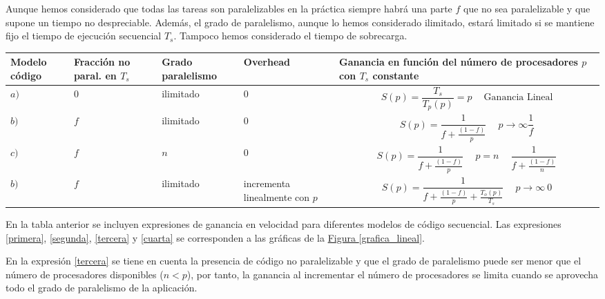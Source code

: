 \documentclass[10pt,a4paper,spanish]{report}
\begin{document}
Aunque hemos considerado que todas las tareas son paralelizables en la práctica siempre habrá una parte $f$ que no sea paralelizable y que supone un tiempo no despreciable.  Además, el grado de paralelismo, aunque lo hemos considerado ilimitado, estará limitado si se mantiene fijo el tiempo de ejecución secuencial $T_s$. Tampoco hemos considerado el tiempo de sobrecarga. 

\begin{tabular}{|p{2cm}|p{2cm}|p{2cm}|p{2cm}|p{7cm}|}
\hline
\rowcolor[rgb]{0.2,0.7,0.6} \textcolor[rgb]{1,1,1}{\textbf{Modelo código}} & \textcolor[rgb]{1,1,1}{\textbf{Fracción no paral. en $T_s$}} & \textcolor[rgb]{1,1,1}{\textbf{Grado paralelismo}} & \textcolor[rgb]{1,1,1}{\textbf{Overhead}} & \textcolor[rgb]{1,1,1}{\textbf{Ganancia en función del número de procesadores $p$ con $T_s$ constante}} \\
\hline
$a)$ & $0$ & ilimitado & $0$ & \begin{equation}S(p)=\frac{T_s}{T_p(p)} = p \quad\ \textrm{Ganancia Lineal} \label{primera} \end{equation} \\
\hline
$b)$ & $f$ & ilimitado & $0$ & \begin{equation}S(p) = \frac{1}{f+\frac{(1-f)}{p}} \quad\ p \rightarrow \infty \frac{1}{f} \label{segunda} \end{equation} \\
\hline
$c)$ & $f$ & $n$ & $0$ & \begin{equation}S(p) = \frac{1}{f+\frac{(1-f)}{p}} \quad\ p=n \quad\ \frac{1}{f+\frac{(1-f)}{n}} \label{tercera} \end{equation} \\
\hline
$b)$ & $f$ & ilimitado & incrementa linealmente con $p$ & \begin{equation}S(p) = \frac{1}{f+\frac{(1-f)}{p}+\frac{T_o(p)}{T_s}} \quad\ p \rightarrow \infty ~ 0 \label{cuarta} \end{equation} \\
\hline
\end{tabular}

En la tabla anterior se incluyen expresiones de ganancia en velocidad  para diferentes modelos de código secuencial. Las expresiones \ref*{primera}, \ref*{segunda}, \ref*{tercera} y \ref*{cuarta} se corresponden a las gráficas de la \hyperref[grafica_lineal]{Figura \ref*{grafica_lineal}}. 

En la expresión \ref*{tercera} se tiene en cuenta la presencia de código no paralelizable y que el grado de paralelismo puede ser menor que el número de procesadores disponibles ($n < p$), por tanto, la ganancia al incrementar el número de procesadores se limita cuando se aprovecha todo el grado de paralelismo de la aplicación.
\end{document}
